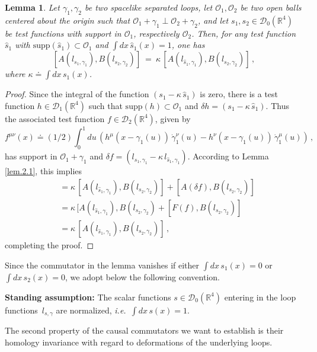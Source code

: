 \documentclass[11pt]{article}
\newtheorem{lemma}[theorem]{Lemma}
\numberwithin{equation}{section}
\newcommand{\RR}{{\mathbb R}}
\newcommand{\Dc}{{\mathcal{D}}}
\newcommand{\Oc}{{\mathcal{O}}}
\newcommand{\supp}{{\mathrm{supp}}}
\def\ie{{\it i.e.\ }}
\begin{document}
\begin{lemma}
\label{lem.3.1}
Let $\gamma_1,\gamma_2$ be two spacelike separated loops, 
let $\Oc_1,\Oc_2$  be two open balls centered about the origin 
such that $\Oc_1 + \gamma_1 \perp \Oc_2 + \gamma_2$, 
and let $s_1,s_2 \in \Dc_0(\RR^4)$ be test 
functions with support in $\Oc_1$, respectively $\Oc_2$.  
Then, for any test function $\widehat s_1$ 
with $\supp(\widehat s_1) \subset \Oc_1$ and  
$\int \! dx \, \widehat s_1(x) = 1$, one has 
%
$$
[ A(l_{s_1,\gamma_1})  , B(l_{s_2,\gamma_2}) ] 
\ = \ \kappa \,  [ A(l_{\widehat s_{1},\gamma_1})  , B(l_{s_2,\gamma_2}) ]  \, ,
$$
%
where 
$\kappa \doteq \int \! dx \, s_1(x)$.
\end{lemma}
\begin{proof}
Since the integral of the function 
$(s_1-\kappa\, \widehat s_1)$ is zero, there is a 
test function $h \in \Dc_1(\RR^4)$ 
such that $\supp(h) \subset \Oc_1$ and 
$\delta h = (s_1 - \kappa \, \widehat s_1)$. Thus
the associated test function $f \in \Dc_2(\RR^4)$,  
given by
$$
 f^{\mu\nu}(x) \doteq (1/2) \int_0^1 \! du \, 
\left(h^\mu(x-\gamma_1(u)) \, \dot{\gamma}^\nu_1(u)- 
h^{\nu}(x-\gamma_1(u)) \, \dot{\gamma}^\mu_1(u)\right)
\, , 
$$   
has support in 
$\Oc_1 + \gamma_1$ and  
$\delta f= (l_{s_1,\gamma_1} - \kappa \, l_{\widehat s_1,\gamma_1})$. 
According to Lemma \ref{lem.2.1}, this implies 
%
\begin{align*}
[ A(l_{s_1,\gamma_1})  , B(l_{s_2,\gamma_2})] & = 
\kappa\,[ A(l_{\widehat s_1,\gamma_1})  , B(l_{s_2,\gamma_2})] + 
[ A(\delta f)  , B(l_{s_2,\gamma_2})] \\
& =
\kappa\,[ A(l_{\widehat s_1,\gamma_1})  , B(l_{s_2,\gamma_2}) + 
[ F(f)  , B(l_{s_2,\gamma_2})] \\ 
& = \kappa\,[ A(l_{\widehat s_1,\gamma_1})  , B(l_{s_2,\gamma_2})] \, , 
\end{align*} 
completing the proof.
\end{proof}
%

\noindent Since the commutator in the lemma vanishes if either 
$\int \! dx  \, s_1(x) =0 $ or $\int \! dx \, s_2(x) =0$, 
we adopt below the following convention.

\medskip 
\noindent \textbf{Standing assumption:} 
The scalar functions $s \in \Dc_0(\RR^4)$ entering in the loop 
functions~$l_{s,\gamma}$ are normalized, \ie $\int \! dx \, s(x) = 1$. 

\medskip
The second property of the causal commutators 
we want to establish is their homology invariance
with regard to deformations of the underlying loops. 
\end{document}
